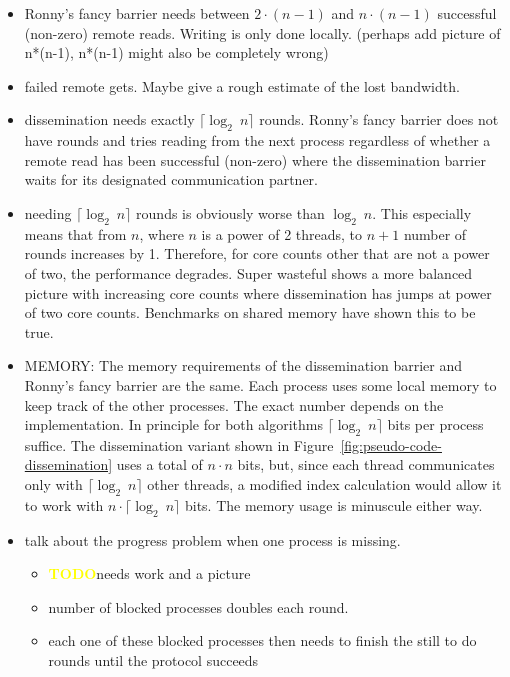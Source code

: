 \documentclass[a4paper, 10pt]{article}
\def \todo{\textbf{\textcolor{yellow}{TODO}}}
\begin{document}
\begin{itemize}
	\item Ronny's fancy barrier needs between $2 \cdot (n-1)$ and $n \cdot (n-1)$ successful (non-zero) remote reads. Writing is only done locally. (perhaps add picture of n*(n-1), n*(n-1) might also be completely wrong)
	\item failed remote gets. Maybe give a rough estimate of the lost bandwidth.
	\item dissemination needs exactly $\lceil \log _2~n \rceil$ rounds. Ronny's fancy barrier does not have rounds and tries reading from the next process regardless of whether a remote read has been successful (non-zero) where the dissemination barrier waits for its designated communication partner.
	\item needing $\lceil \log _2~n \rceil$ rounds is obviously worse than $\log _2~n$. This especially means that from $n$, where $n$ is a power of 2 threads, to $n+1$ number of rounds increases by 1. Therefore, for core counts other that are not a power of two, the performance degrades. Super wasteful shows a more balanced picture with increasing core counts where dissemination has jumps at power of two core counts. Benchmarks on shared memory have shown this to be true.
	\item MEMORY: The memory requirements of the dissemination barrier and Ronny's fancy barrier are the same. Each process uses some local memory to keep track of the other processes. The exact number depends on the implementation. In principle for both algorithms $\lceil \log _2~n \rceil$ bits per process suffice. The dissemination variant shown in Figure~\ref{fig:pseudo-code-dissemination} uses a total of $n \cdot n$ bits, but, since each thread communicates only with $\lceil \log _2~n \rceil$ other threads, a modified index calculation would allow it to work with $n \cdot \lceil \log _2 ~n \rceil$ bits. The memory usage is minuscule either way.
	\item talk about the progress problem when one process is missing.
		\begin{itemize}
			\item \todo needs work and a picture
			\item number of blocked processes doubles each round.
			\item each one of these blocked processes then needs to finish the still to do rounds until the protocol succeeds


\end{itemize}
\end{itemize}
\end{document}
